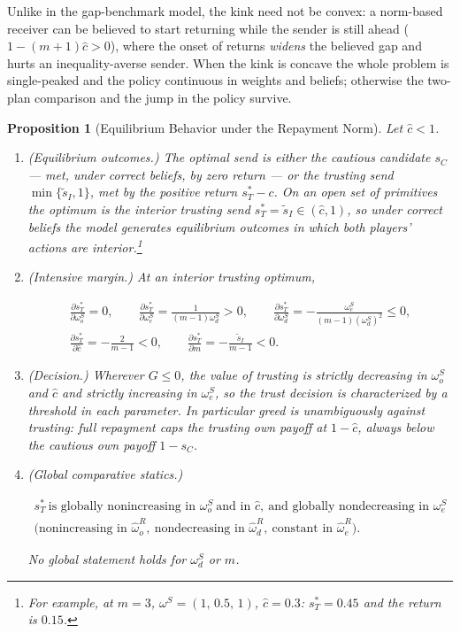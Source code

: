 \documentclass[11pt]{article}
\theoremstyle{plain}
\newtheorem{proposition}{Proposition}
\theoremstyle{remark}
\begin{document}
Unlike in the gap-benchmark model, the kink need not be convex: a norm-based receiver can be believed to start returning while the sender is still ahead ($1-(m+1)\hat c>0$), where the onset of returns \emph{widens} the believed gap and hurts an inequality-averse sender.  When the kink is concave the whole problem is single-peaked and the policy continuous in weights and beliefs; otherwise the two-plan comparison and the jump in the policy survive.

\begin{proposition}[Equilibrium Behavior under the Repayment Norm]
\label{prop:norm2_sender}
Let $\hat c<1$.
\begin{enumerate}[topsep=2pt,itemsep=2pt]
\item \emph{(Equilibrium outcomes.)}  The optimal send is either the cautious candidate $s_C$ --- met, under correct beliefs, by zero return --- or the trusting send $\min\{\tilde s_I,1\}$, met by the positive return $s_T^\ast-c$.  On an open set of primitives the optimum is the \emph{interior} trusting send $s_T^\ast=\tilde s_I\in(\hat c,1)$, so under correct beliefs the model generates equilibrium outcomes in which both players' actions are interior.\footnote{For example, at $m=3$, $\omega^S=(1,\,0.5,\,1)$, $\hat c=0.3$: $s_T^\ast=0.45$ and the return is $0.15$.}
\item \emph{(Intensive margin.)}  At an interior trusting optimum,
\begin{csbox}
\begin{gather*}
        \frac{\partial s_T^\ast}{\partial\omega_o^S}=0,
        \qquad
        \frac{\partial s_T^\ast}{\partial\omega_e^S}=\frac{1}{(m-1)\omega_d^S}>0,
        \qquad
        \frac{\partial s_T^\ast}{\partial\omega_d^S}=-\frac{\omega_e^S}{(m-1)(\omega_d^S)^2}\le0,
        \\
        \frac{\partial s_T^\ast}{\partial\hat c}=-\frac{2}{m-1}<0,
        \qquad
        \frac{\partial s_T^\ast}{\partial m}=-\frac{\tilde s_I}{m-1}<0.
\end{gather*}
\end{csbox}
\item \emph{(Decision.)}  Wherever $G\le0$, the value of trusting is strictly decreasing in $\omega_o^S$ and $\hat c$ and strictly increasing in $\omega_e^S$, so the trust decision is characterized by a threshold in each parameter.  In particular greed is unambiguously against trusting: full repayment caps the trusting own payoff at $1-\hat c$, always below the cautious own payoff $1-s_C$.
\item \emph{(Global comparative statics.)}
\begin{csbox}
\begin{gather*}
        s_T^\ast\ \text{is globally nonincreasing in }\omega_o^S\ \text{and in }\hat c,\ \text{and globally nondecreasing in }\omega_e^S\\
        \big(\text{nonincreasing in }\hat\omega_o^{R},\ \text{nondecreasing in }\hat\omega_d^{R},\ \text{constant in }\hat\omega_e^{R}\big).
\end{gather*}
\end{csbox}
No global statement holds for $\omega_d^S$ or $m$.
\end{enumerate}
\end{proposition}
\end{document}
